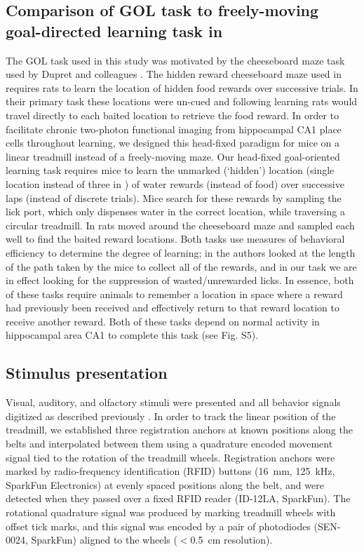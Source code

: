\subsection{Comparison of GOL task to freely-moving goal-directed learning task in \citeauthor{Dupret2010a}}\label{sec:df:methods:comp}
The GOL task used in this study was motivated by the cheeseboard maze task used by Dupret and colleagues \citep{Dupret2010a}. The hidden reward cheeseboard maze used in \citeauthor{Dupret2010a} requires rats to learn the location of hidden food rewards over successive trials. In their primary task these locations were un-cued and following learning rats would travel directly to each baited location to retrieve the food reward. In order to facilitate chronic two-photon functional imaging from hippocampal CA1 place cells throughout learning, we designed this head-fixed paradigm for mice on a linear treadmill instead of a freely-moving maze. Our head-fixed goal-oriented learning task requires mice to learn the unmarked (`hidden') location (single location instead of three in \citeauthor{Dupret2010a}) of water rewards (instead of food) over successive laps (instead of discrete trials). Mice search for these rewards by sampling the lick port, which only dispenses water in the correct location, while traversing a circular treadmill. In \citeauthor{Dupret2010a} rats moved around the cheeseboard maze and sampled each well to find the baited reward locations. Both tasks use measures of behavioral efficiency to determine the degree of learning; in \citeauthor{Dupret2010a} the authors looked at the length of the path taken by the mice to collect all of the rewards, and in our task we are in effect looking for the suppression of wasted/unrewarded licks. In essence, both of these tasks require animals to remember a location in space where a reward had previously been received and effectively return to that reward location to receive another reward. Both of these tasks depend on normal activity in hippocampal area CA1 to complete this task (see Fig. S5).

\subsection{Stimulus presentation}
Visual, auditory, and olfactory stimuli were presented and all behavior signals digitized as described previously \citep{Danielson2016b, Kaifosh2013, Lovett-Barron2014}. In order to track the linear position of the treadmill, we established three registration anchors at known positions along the belts and interpolated between them using a quadrature encoded movement signal tied to the rotation of the treadmill wheels. Registration anchors were marked by radio-frequency identification (RFID) buttons (16~mm, 125~kHz, SparkFun Electronics) at evenly spaced positions along the belt, and were detected when they passed over a fixed RFID reader (ID-12LA, SparkFun).  The rotational quadrature signal was produced by marking treadmill wheels with offset tick marks, and this signal was encoded by a pair of photodiodes (SEN-0024, SparkFun) aligned to the wheels ($<$0.5~cm resolution).
